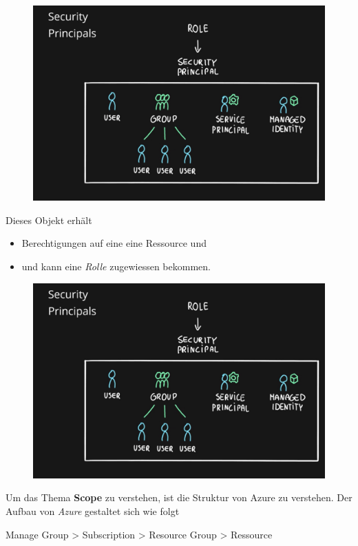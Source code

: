 \begin{figure}[H]
	\centering
	\includegraphics[scale = 0.2]{attachment/chapter_2/Scc121}
\end{figure}

Dieses Objekt erhält
\begin{itemize}
	\item Berechtigungen auf eine eine Ressource und 
	\item und kann eine \textit{Rolle} zugewiessen bekommen. 
\end{itemize} 

\begin{figure}[H]
	\centering
	\includegraphics[scale = 0.2]{attachment/chapter_2/Scc121}
\end{figure}

Um das Thema \textbf{Scope} zu verstehen, ist die Struktur von Azure zu verstehen.
Der Aufbau von \textit{Azure} gestaltet sich wie folgt
\begin{center} 
	\item Manage Group > Subscription > Resource Group > Ressource
\end{center}

